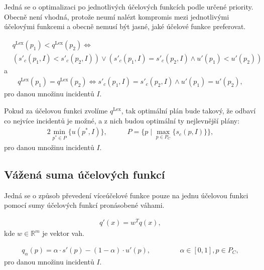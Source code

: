 Jedná se o optimalizaci po jednotlivých účelových funkcích podle určené priority. 
Obecně není vhodná, protože neumí nalézt kompromis mezi jednotlivými účelovými funkcemi a obecně nemusí být jasné, jaké účelové funkce preferovat.

\begin{definice}\label{df:lexPorovnaniPohotovost}
  \begin{align*}
    & q^{\text{Lex}}(p_1) < q^{\text{Lex}}(p_2)\Leftrightarrow\\
    & ( s'_c(p_1, I) < s'_c(p_2, I)) \lor (s'_c(p_1, I) = s'_c(p_2, I) \land u'(p_1) < u'(p_2))
  \end{align*}
  a 
  \begin{align*}
    q^{\text{Lex}}(p_1) = q^{\text{Lex}}(p_2) \Leftrightarrow s'_c(p_1, I) = s'_c(p_2, I) \land u'(p_1) = u'(p_2),
  \end{align*}
  pro danou množinu incidentů $I$.
\end{definice}

Pokud za účelovou funkci zvolíme $q^{\text{Lex}}$, tak optimální plán bude takový, že odbaví co nejvíce incidentů je možné, a z nich budou optimální ty nejlevnější plány:
\begin{alignat*}{2}
  \min_{p^* \in P} \{ u(p^*, I) \}, && \hspace{15pt} P = \{ p \mid \max_{p \in P_C} \{ s_c(p, I) \} \},
\end{alignat*}
pro danou množinu incidentů $I$.

\subsection{Vážená suma účelových funkcí}\label{kap:vazenaSumaUcelF}

Jedná se o způsob převedení víceúčelové funkce pouze na jednu účelovou funkci pomocí sumy účelových funkcí pronásobené váhami.

\begin{definice}
  \begin{align*}
    q'(x) = w^T q(x),
  \end{align*}
  kde $w \in \mathbb{R}^m$ je vektor vah.
\end{definice}

\begin{definice}\label{df:vazenaSumaPohotovost}
  \begin{align*}
    q_{\alpha}(p) = \alpha \cdot s'(p) - (1 - \alpha) \cdot u'(p), \hspace{50pt} \alpha \in [0, 1], p \in P_C,
  \end{align*}
  pro danou množinu incidentů $I$.
\end{definice}

